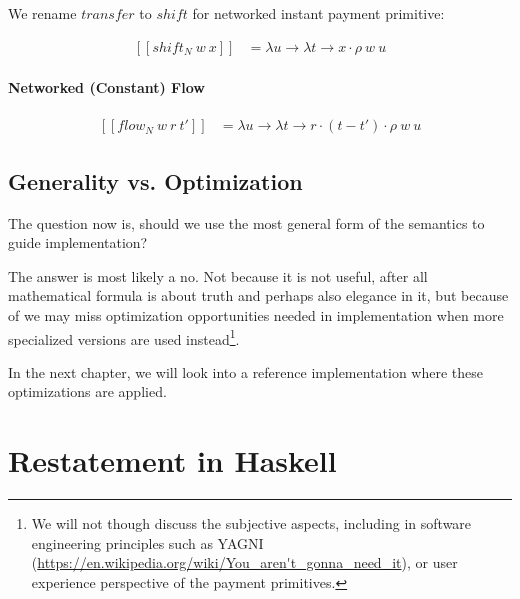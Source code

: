 We rename $transfer$ to $shift$ for networked instant payment primitive:

\begin{equation}
    \begin{split}
        [\![shift_N\ w\ x]\!] &=
        \lambda u \rightarrow \lambda t \rightarrow x \cdot \rho\ w\ u
    \end{split}
\end{equation}

\paragraph{Networked (Constant) Flow}

\begin{equation}
    \begin{split}
        [\![flow_N\ w\ r\ t']\!] &=
        \lambda u \rightarrow \lambda t \rightarrow r \cdot (t - t') \cdot \rho\ w\ u
    \end{split}
\end{equation}

\subsection{Generality vs. Optimization}

The question now is, should we use the most general form of the semantics to guide implementation?

The answer is most likely a no. Not because it is not useful, after all mathematical formula is
about truth and perhaps also elegance in it, but because of we may miss optimization opportunities
needed in implementation when more specialized versions are used instead\footnote{We will not though
discuss the subjective aspects, including in software engineering principles such as YAGNI
(\url{https://en.wikipedia.org/wiki/You_aren't_gonna_need_it}), or user experience perspective of
the payment primitives.}.

In the next chapter, we will look into a reference implementation where these optimizations are
applied.

\section{Restatement in Haskell}



